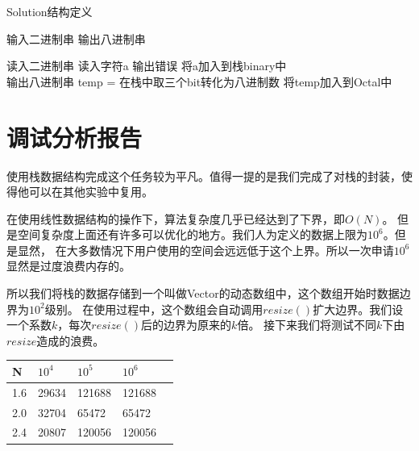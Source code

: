 \begin{algorithm}[htb] 
   \caption{ Solution结构定义 } 
   \label{alg:Framwork} 
   \begin{algorithmic}[1]
      \Require 输入二进制串
      \Ensure 输出八进制串
      
      \State 读入二进制串
         \State 读入字符a
               \State 输出错误
            \EndIf
            \State 将a加入到栈binary中
         \EndWhile
      \EndFunction \\

      \State 输出八进制串
            \State temp = 在栈中取三个bit转化为八进制数
            \State 将temp加入到Octal中
         \EndWhile
      \EndFunction
   \end{algorithmic} 
\end{algorithm}

\section{调试分析报告}
   使用栈数据结构完成这个任务较为平凡。值得一提的是我们完成了对栈的封装，使得他可以在其他实验中复用。


   在使用线性数据结构的操作下，算法复杂度几乎已经达到了下界，即$O(N)$。
   但是空间复杂度上面还有许多可以优化的地方。我们人为定义的数据上限为$10^6$。但是显然，
   在大多数情况下用户使用的空间会远远低于这个上界。所以一次申请$10^6$显然是过度浪费内存的。


   所以我们将栈的数据存储到一个叫做Vector的动态数组中，这个数组开始时数据边界为$10^2$级别。
   在使用过程中，这个数组会自动调用$resize()$扩大边界。我们设一个系数$k$，每次$resize()$后的边界为原来的$k$倍。
   接下来我们将测试不同$k$下由$resize$造成的浪费。



\begin{longtable}[c]{@{}lllll@{}}
   \toprule
   N   & $10^4$ & $10^5$ & $10^6$ &  \\* \midrule
   \endfirsthead
   \endhead
   \bottomrule
   \endfoot
   \endlastfoot
   1.6 & 29634  & 121688 & 121688 &  \\
   2.0 & 32704  & 65472  & 65472  &  \\
   2.4 & 20807  & 120056 & 120056 &  \\* \bottomrule
   \end{longtable}


